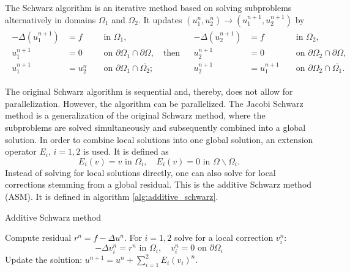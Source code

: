 \begin{definition}
    The Schwarz algorithm is an iterative method based on solving subproblems alternatively in domains $\Omega_1$ and $\Omega_2$. It updates $\left(u_1^n, u_2^n\right) \rightarrow\left(u_1^{n+1}, u_2^{n+1}\right)$ by
    \[
        \begin{array}{cc}
            \begin{aligned}
                -\Delta\left(u_1^{n+1}\right) & =f     &  & \text { in } \Omega_1,                                                 \\
                u_1^{n+1}                     & =0     &  & \text { on } \partial \Omega_1 \cap \partial \Omega, \quad \text{then} \\
                u_1^{n+1}                     & =u_2^n &  & \text { on } \partial \Omega_1 \cap \overline{\Omega_2} ;
            \end{aligned} &
            \begin{aligned}
                -\Delta\left(u_2^{n+1}\right) & =f         &  & \text { in } \Omega_2,                                   \\
                u_2^{n+1}                     & =0         &  & \text { on } \partial \Omega_2 \cap \partial \Omega,     \\
                u_2^{n+1}                     & =u_1^{n+1} &  & \text { on } \partial \Omega_2 \cap \overline{\Omega_1}.
            \end{aligned}
        \end{array}
    \]
    \label{def:schwarz_algorithm}
\end{definition}

The original Schwarz algorithm is sequential and, thereby, does not allow for parallelization. However, the algorithm can be parallelized. The Jacobi Schwarz method is a generalization of the original Schwarz method, where the subproblems are solved simultaneously and subsequently combined into a global solution. In order to combine local solutions into one global solution, an extension operator $E_i$, $i=1,2$ is used. It is defined as
\[
    E_i(v)=v \text { in } \Omega_i, \quad E_i(v)=0 \text { in } \Omega \backslash \Omega_i.
\]
Instead of solving for local solutions directly, one can also solve for local corrections stemming from a global residual. This is the additive Schwarz method (ASM). It is defined in algorithm \ref{alg:additive_schwarz}.
\begin{algorithm}[H]
    \caption{Additive Schwarz method \cite[Algorithm 1.2]{schwarz_methods_Dolean_2015}}
    \label{alg:additive_schwarz}
    \begin{algorithmic}
        \State Compute residual $r^n=f-\Delta u^n$.
        \State For $i=1,2$ solve for a local correction $v_i^n$:
        \[
            -\Delta v_i^n=r^n \text{ in } \Omega_i, \quad v_i^n=0 \text{ on } \partial \Omega_i
        \]
        \State Update the solution: $u^{n+1}=u^n+\sum_{i=1}^{2}E_i(v_i)^n$.
    \end{algorithmic}
\end{algorithm}

